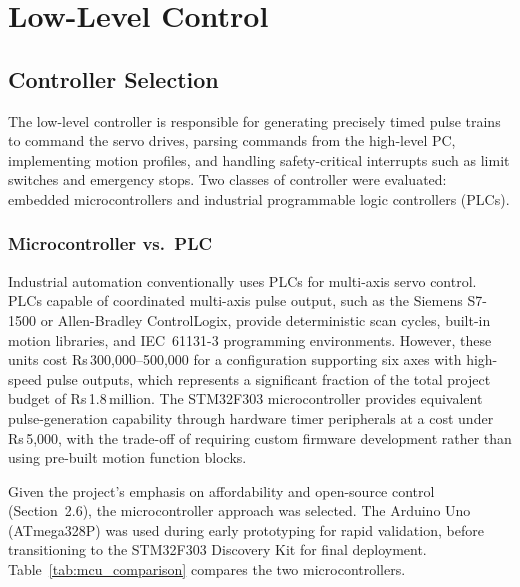 \chapter{Low-Level Control}

\section{Controller Selection}

The low-level controller is responsible for generating precisely timed pulse trains to command the servo drives, parsing commands from the high-level PC, implementing motion profiles, and handling safety-critical interrupts such as limit switches and emergency stops. Two classes of controller were evaluated: embedded microcontrollers and industrial programmable logic controllers (PLCs).

\subsection{Microcontroller vs.\ PLC}

Industrial automation conventionally uses PLCs for multi-axis servo control. PLCs capable of coordinated multi-axis pulse output, such as the Siemens S7-1500 or Allen-Bradley ControlLogix, provide deterministic scan cycles, built-in motion libraries, and IEC~61131-3 programming environments. However, these units cost Rs\,300,000--500,000 for a configuration supporting six axes with high-speed pulse outputs, which represents a significant fraction of the total project budget of Rs\,1.8\,million. The STM32F303 microcontroller provides equivalent pulse-generation capability through hardware timer peripherals at a cost under Rs\,5,000, with the trade-off of requiring custom firmware development rather than using pre-built motion function blocks.

Given the project's emphasis on affordability and open-source control (Section~2.6), the microcontroller approach was selected. The Arduino Uno (ATmega328P) was used during early prototyping for rapid validation, before transitioning to the STM32F303 Discovery Kit for final deployment. Table~\ref{tab:mcu_comparison} compares the two microcontrollers.

